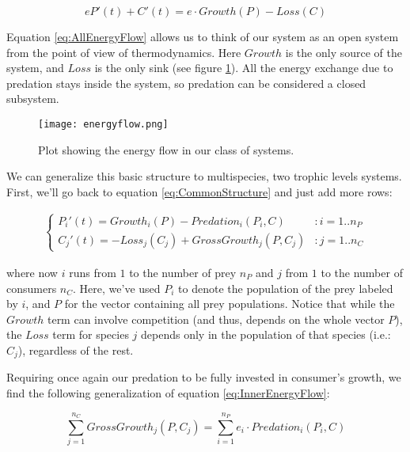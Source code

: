 \begin{equation}
\label{eq:AllEnergyFlow}
	e P'(t) + C'(t) = e \cdot Growth(P) - Loss(C)
\end{equation}

Equation \ref{eq:AllEnergyFlow} allows us to think of our system as an open system from the point of view of thermodynamics. Here $Growth$ is the only source of the system, and $Loss$ is the only sink (see figure \ref{fig:EnergyFlow}). All the energy exchange due to predation stays inside the system, so predation can be considered a closed subsystem.

\begin{figure}[H]
	\begin{center}
		\texttt{[image: energyflow.png]}
	\end{center}
	\caption{Plot showing the energy flow in our class of systems.}
	\label{fig:EnergyFlow}
\end{figure}

We can generalize this basic structure to multispecies, two trophic levels systems. First, we'll go back to equation \ref{eq:CommonStructure} and just add more rows:

\begin{eqnarray}
\label{eq:CommonStructureMulti}
	\begin{cases}
	P_i'(t) = Growth_i(P) - Predation_i(P_i,C) & : i = 1..n_P
	\\
	C_j'(t) = -Loss_j(C_j) + GrossGrowth_j(P,C_j) & : j = 1..n_C
	\end{cases}
\end{eqnarray}

where now $i$ runs from $1$ to the number of prey $n_P$ and $j$ from $1$ to the number of consumers $n_C$. Here, we've used $P_i$ to denote the population of the prey labeled by $i$, and $P$ for the vector containing all prey populations. Notice that while the $Growth$ term can involve competition (and thus, depends on the whole vector $P$), the $Loss$ term for species $j$ depends only in the population of that species (i.e.: $C_j$), regardless of the rest.

Requiring once again our predation to be fully invested in consumer's growth, we find the following generalization of equation \ref{eq:InnerEnergyFlow}:

\begin{equation}
\label{eq:InnerEnergyFlowMulti}
	\sum_{j = 1}^{n_C} GrossGrowth_j(P,C_j) = \sum_{i = 1}^{n_P} e_i \cdot Predation_i(P_i,C)
\end{equation}

